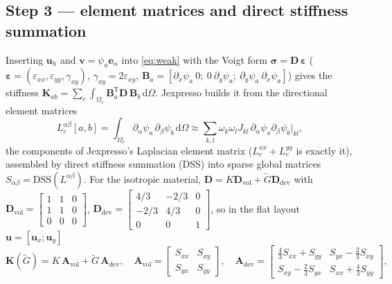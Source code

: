 \documentclass[11pt]{article}
\newcommand{\bu}{\bm{u}}
\newcommand{\bv}{\bm{v}}
\newcommand{\bsig}{\bm{\sigma}}
\newcommand{\beps}{\bm{\varepsilon}}
\newcommand{\dd}{\,\mathrm{d}}
\begin{document}
\subsection*{Step 3 --- element matrices and direct stiffness summation}
Inserting $\bu_h$ and $\bv=\psi_a\bm e_\alpha$ into \eqref{eq:weak} with the
Voigt form $\bsig=\mathbf D\,\beps$ ($\beps=(\varepsilon_{xx},\varepsilon_{yy},\gamma_{xy})$,
$\gamma_{xy}=2\varepsilon_{xy}$, $\mathbf B_a=[\partial_x\psi_a\ 0;\ 0\ \partial_y\psi_a;\ \partial_y\psi_a\ \partial_x\psi_a]$)
gives the stiffness $\mathbf K_{ab}=\sum_e\int_{\Omega_e}\mathbf B_a^{\mathsf T}\mathbf D\,\mathbf B_b\dd\Omega$.
Jexpresso builds it from the directional element matrices
\begin{equation}
  L^{\alpha\beta}_e[a,b] = \int_{\Omega_e}\partial_\alpha\psi_a\,\partial_\beta\psi_b\dd\Omega
  \approx\sum_{k,l}\omega_k\omega_l J_{kl}\,\partial_\alpha\psi_a\partial_\beta\psi_b\big|_{kl},
\end{equation}
the components of Jexpresso's Laplacian element matrix ($L^{xx}_e+L^{yy}_e$ is
exactly it), assembled by direct stiffness summation (DSS) into sparse global matrices
$S_{\alpha\beta}=\mathrm{DSS}(L^{\alpha\beta})$. For the isotropic material,
$\mathbf D=K\mathbf D_{\mathrm{vol}}+\tilde G\mathbf D_{\mathrm{dev}}$ with
$\mathbf D_{\mathrm{vol}}=\left[\begin{smallmatrix}1&1&0\\1&1&0\\0&0&0\end{smallmatrix}\right]$,
$\mathbf D_{\mathrm{dev}}=\left[\begin{smallmatrix}4/3&-2/3&0\\-2/3&4/3&0\\0&0&1\end{smallmatrix}\right]$,
so in the flat layout $\mathbf u=[\mathbf u_x;\mathbf u_y]$
\begin{equation}
  \mathbf K(\tilde G)=K\,\mathbf A_{\mathrm{vol}}+\tilde G\,\mathbf A_{\mathrm{dev}},\quad
  \mathbf A_{\mathrm{vol}}=\begin{bmatrix}S_{xx}&S_{xy}\\S_{yx}&S_{yy}\end{bmatrix},\quad
  \mathbf A_{\mathrm{dev}}=\begin{bmatrix}\tfrac43S_{xx}+S_{yy}&S_{yx}-\tfrac23S_{xy}\\S_{xy}-\tfrac23S_{yx}&S_{xx}+\tfrac43S_{yy}\end{bmatrix},
  \label{eq:operators}
\end{equation}
\end{document}
